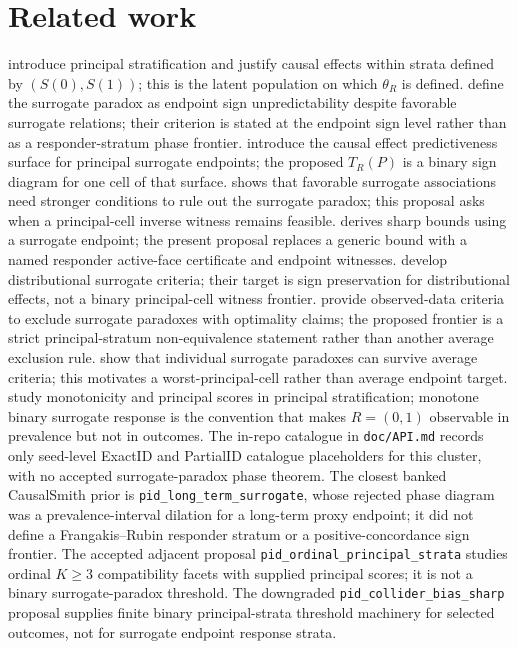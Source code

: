\documentclass[11pt]{article}
\theoremstyle{definition}
\theoremstyle{plain}
\theoremstyle{remark}
\begin{document}
\section{Related work}
\citet{FrangakisRubin2002} introduce principal stratification and justify causal effects within strata defined by \((S(0),S(1))\); this is the latent population on which \(\theta_R\) is defined.
\citet[p.~920, Summary]{ChenGengJia2007} define the surrogate paradox as endpoint sign unpredictability despite favorable surrogate relations; their criterion is stated at the endpoint sign level rather than as a responder-stratum phase frontier.
\citet{GilbertHudgens2008} introduce the causal effect predictiveness surface for principal surrogate endpoints; the proposed \(T_R(P)\) is a binary sign diagram for one cell of that surface.
\citet[Sec.~3]{VanderWeele2013} shows that favorable surrogate associations need stronger conditions to rule out the surrogate paradox; this proposal asks when a principal-cell inverse witness remains feasible.
\citet[Sec.~3]{Kuroki2013} derives sharp bounds using a surrogate endpoint; the present proposal replaces a generic bound with a named responder active-face certificate and endpoint witnesses.
\citet{JuGeng2010} develop distributional surrogate criteria; their target is sign preservation for distributional effects, not a binary principal-cell witness frontier.
\citet[Sec.~3, Theorems~1--2]{YinLiuGengLuo2019} provide observed-data criteria to exclude surrogate paradoxes with optimality claims; the proposed frontier is a strict principal-stratum non-equivalence statement rather than another average exclusion rule.
\citet{MaYinLiuGeng2021} show that individual surrogate paradoxes can survive average criteria; this motivates a worst-principal-cell rather than average endpoint target.
\citet{DingLu2017} study monotonicity and principal scores in principal stratification; monotone binary surrogate response is the convention that makes \(R=(0,1)\) observable in prevalence but not in outcomes.
The in-repo catalogue in \texttt{doc/API.md} records only seed-level ExactID and PartialID catalogue placeholders for this cluster, with no accepted surrogate-paradox phase theorem.
The closest banked CausalSmith prior is \texttt{pid\_long\_term\_surrogate}, whose rejected phase diagram was a prevalence-interval dilation for a long-term proxy endpoint; it did not define a Frangakis--Rubin responder stratum or a positive-concordance sign frontier.
The accepted adjacent proposal \texttt{pid\_ordinal\_principal\_strata} studies ordinal \(K\ge3\) compatibility facets with supplied principal scores; it is not a binary surrogate-paradox threshold.
The downgraded \texttt{pid\_collider\_bias\_sharp} proposal supplies finite binary principal-strata threshold machinery for selected outcomes, not for surrogate endpoint response strata.
\end{document}
